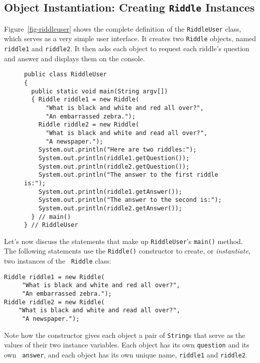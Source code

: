 \subsection{Object Instantiation: Creating {\tt Riddle} Instances}

\noindent Figure~\ref{fig-riddleuser} shows the complete definition of the
{\tt RiddleUser} class, which serves as a very simple user
interface. It creates two {\tt Riddle} objects, named {\tt riddle1}
and {\tt riddle2}. It then asks each object to request each riddle's
question and answer and displays them on the console.

\begin{figure}[bh]
\jjjprogstart
\begin{jjjlisting}[27pc]
\begin{lstlisting}
public class RiddleUser
{
  public static void main(String argv[])
  { Riddle riddle1 = new Riddle(
      "What is black and white and red all over?",
      "An embarrassed zebra.");
    Riddle riddle2 = new Riddle(
      "What is black and white and read all over?",
      "A newspaper.");
    System.out.println("Here are two riddles:");
    System.out.println(riddle1.getQuestion());
    System.out.println(riddle2.getQuestion());
    System.out.println("The answer to the first riddle is:");
    System.out.println(riddle1.getAnswer());
    System.out.println("The answer to the second is:");
    System.out.println(riddle2.getAnswer());
  } // main()
} // RiddleUser
\end{lstlisting}
\end{jjjlisting}
\end{figure}

\noindent Let's now discuss the statements that make up {\tt RiddleUser}'s 
{\tt main()} method.  The following statements use the {\tt Riddle()}
constructor to create, or {\it instantiate}, two instances of the {\tt
Riddle} class:

\begin{jjjlisting}
\begin{lstlisting}
Riddle riddle1 = new Riddle(
     "What is black and white and red all over?",
     "An embarrassed zebra.");
Riddle riddle2 = new Riddle(
    "What is black and white and read all over?",
     "A newspaper.");
\end{lstlisting}
\end{jjjlisting}

\noindent Note how the constructor gives each object a pair
of {\tt String}s that serve as the values of their two instance
variables. Each object has its own {\tt question} and its own {\tt
answer}, and each object has its own unique name, {\tt riddle1} and
{\tt riddle2}.

